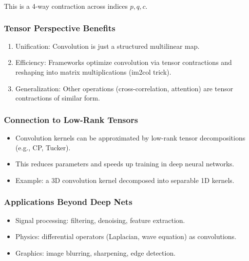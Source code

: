 \documentclass[
  letterpaper,
  DIV=11,
  numbers=noendperiod]{scrreprt}
\providecommand{\tightlist}{%
  \setlength{\itemsep}{0pt}\setlength{\parskip}{0pt}}
\begin{document}
This is a 4-way contraction across indices \(p,q,c\).

\subsubsection{Tensor Perspective
Benefits}\label{tensor-perspective-benefits}

\begin{enumerate}
\def\labelenumi{\arabic{enumi}.}
\tightlist
\item
  Unification: Convolution is just a structured multilinear map.
\item
  Efficiency: Frameworks optimize convolution via tensor contractions
  and reshaping into matrix multiplications (im2col trick).
\item
  Generalization: Other operations (cross-correlation, attention) are
  tensor contractions of similar form.
\end{enumerate}

\subsubsection{Connection to Low-Rank
Tensors}\label{connection-to-low-rank-tensors}

\begin{itemize}
\tightlist
\item
  Convolution kernels can be approximated by low-rank tensor
  decompositions (e.g., CP, Tucker).
\item
  This reduces parameters and speeds up training in deep neural
  networks.
\item
  Example: a 3D convolution kernel decomposed into separable 1D kernels.
\end{itemize}

\subsubsection{Applications Beyond Deep
Nets}\label{applications-beyond-deep-nets}

\begin{itemize}
\tightlist
\item
  Signal processing: filtering, denoising, feature extraction.
\item
  Physics: differential operators (Laplacian, wave equation) as
  convolutions.
\item
  Graphics: image blurring, sharpening, edge detection.
\end{itemize}
\end{document}
